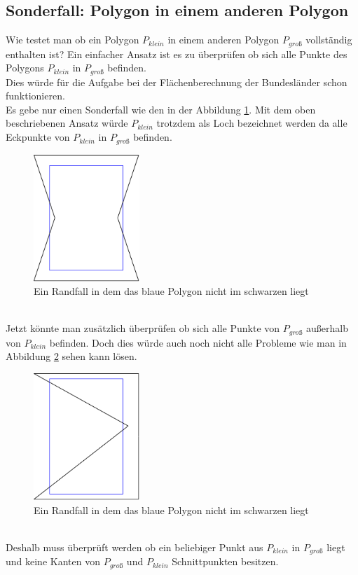\documentclass[conference]{IEEEtran}
\begin{document}
	\subsection{Sonderfall: Polygon in einem anderen Polygon}
	Wie testet man ob ein Polygon $P_{klein}$ in einem anderen Polygon $P_{groß}$ vollständig enthalten ist?
	Ein einfacher Ansatz ist es zu überprüfen ob sich alle Punkte des Polygons $P_{klein}$ in $P_{groß}$ befinden.\\
	Dies würde für die Aufgabe bei der Flächenberechnung der Bundesländer schon funktionieren.\\
	Es gebe nur einen Sonderfall wie den in der Abbildung \ref{polyInPoly}. Mit dem oben beschriebenen Ansatz würde $P_{klein}$ trotzdem als Loch bezeichnet werden da alle Eckpunkte von $P_{klein}$ in $P_{groß}$ befinden.
	\begin{figure}[h]
		\begin{center}
			\includegraphics[width=4cm]{PolyInPoly.png}
			\caption{Ein Randfall in dem das blaue Polygon nicht im schwarzen liegt}
			\label{polyInPoly}
		\end{center}
	\end{figure}\\
	Jetzt könnte man zusätzlich überprüfen ob sich alle Punkte von $P_{groß}$ außerhalb von $P_{klein}$ befinden. Doch dies würde auch noch nicht alle Probleme wie man in Abbildung \ref{polyInPoly2} sehen kann lösen.
	\begin{figure}[h]
		\begin{center}
			\includegraphics[width=4cm]{PolyInPoly2.png}
			\caption{Ein Randfall in dem das blaue Polygon nicht im schwarzen liegt}
			\label{polyInPoly2}
		\end{center}
	\end{figure}\\
	Deshalb muss überprüft werden ob ein beliebiger Punkt aus $P_{klein}$ in $P_{groß}$ liegt und keine Kanten von $P_{groß}$ und $P_{klein}$ Schnittpunkten besitzen.
	
\end{document}
